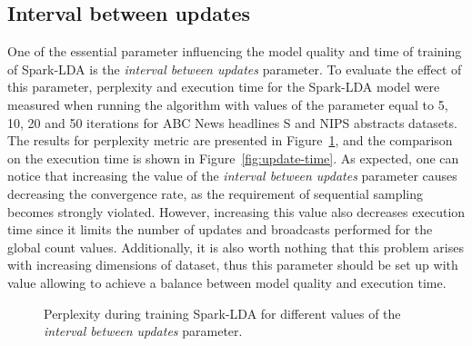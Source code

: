 \documentclass[journal]{IEEEtran}
\begin{document}
\subsection{Interval between updates}
One of the essential parameter influencing the model quality and time of training of Spark-LDA is the \textit{interval between updates} parameter. To evaluate the effect of this parameter, perplexity and execution time for the Spark-LDA model were measured when running the algorithm with values of the parameter equal to 5, 10, 20 and 50 iterations for ABC News headlines S and NIPS abstracts datasets. The results for perplexity metric are presented in Figure~\ref{fig:update-perplex}, and the comparison on the execution time is shown in Figure~\ref{fig:update-time}.  As expected, one can notice that increasing the value of the \textit{interval between updates} parameter causes decreasing the convergence rate, as the requirement of sequential sampling becomes strongly violated. However, increasing this value also decreases execution time since it limits the number of updates and broadcasts performed for the global count values. Additionally, it is also worth nothing that this problem arises with increasing dimensions of dataset, thus this parameter should be set up with value allowing to achieve a balance between model quality and execution time.

\begin{figure}[t]
\centering
{}
\hfil
{}
\caption{Perplexity during training Spark-LDA for different values of the \textit{interval between updates} parameter.}
\label{fig:update-perplex}
\end{figure}
\end{document}
